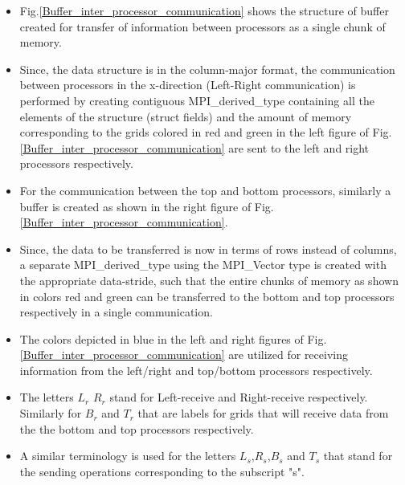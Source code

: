 \documentclass[a4paper,10pt]{article}
\begin{document}
\begin{itemize}
 \item Fig.\ref{Buffer_inter_processor_communication} shows the structure of buffer created for transfer of information between processors as a single chunk of memory.
 \item Since, the data structure is in the column-major format, the communication between processors in the x-direction (Left-Right communication) is performed by creating 
 contiguous MPI\_derived\_type containing all the elements of the structure (struct fields) and the amount of memory corresponding to the grids colored in red and green in the left figure of 
 Fig.\ref{Buffer_inter_processor_communication} are sent to the left and right processors respectively.
 \item For the communication between the top and bottom processors, similarly a buffer is created as shown in the right figure of Fig.\ref{Buffer_inter_processor_communication}.
 \item Since, the data to be transferred is now in terms of rows instead of columns, a separate MPI\_derived\_type using the MPI\_Vector type is created with the appropriate data-stride, 
 such that the entire chunks of memory as shown in colors red and green can be transferred to the bottom and top processors respectively in a single communication.
 \item The colors depicted in blue in the left and right figures of Fig.\ref{Buffer_inter_processor_communication} are utilized for receiving information from the left/right and top/bottom 
 processors respectively.
 \item The letters $L_r$ $R_r$ stand for Left-receive and Right-receive respectively. Similarly for $B_r$ and $T_r$ that are labels for grids that will receive data from the the bottom and 
 top processors respectively.
 \item A similar terminology is used for the letters $L_s$,$R_s$,$B_s$ and $T_s$ that stand for the sending operations corresponding to the subscript "s".
\end{itemize}
\end{document}
